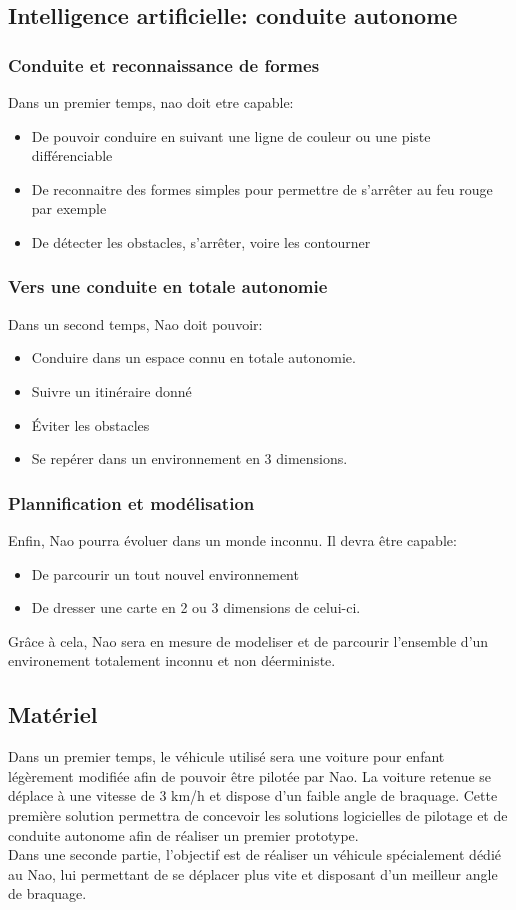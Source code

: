\documentclass[11pt]{report} %
\begin{document}
		\subsection{Intelligence artificielle: conduite autonome}
			\subsubsection{Conduite et reconnaissance de formes}
				Dans un premier temps, nao doit etre capable:
				\begin{itemize}
				\item De pouvoir conduire en suivant une ligne de couleur ou une piste différenciable
				\item De reconnaitre des formes simples pour permettre de s'arrêter au feu rouge par exemple
				\item De détecter les obstacles, s'arrêter, voire les contourner
				\end{itemize}
			\subsubsection{Vers une conduite en totale autonomie}
				Dans un second temps, Nao doit pouvoir:
				\begin{itemize}
			  	\item Conduire dans un espace connu en totale autonomie.
				\item Suivre un itinéraire donné
				\item Éviter les obstacles
				\item Se repérer dans un environnement en 3 dimensions.
				\end{itemize}
			\subsubsection{Plannification et modélisation}
				Enfin, Nao pourra évoluer dans un monde inconnu. Il devra être capable:
				\begin{itemize}
				\item De parcourir un tout nouvel environnement
				\item De dresser une carte en 2 ou 3 dimensions de celui-ci.
				\end{itemize}
				Grâce à cela, Nao sera en mesure de modeliser et de parcourir l'ensemble d'un environement totalement inconnu et non déerministe.
		\subsection{Matériel}
			Dans un premier temps, le véhicule utilisé sera une voiture pour enfant légèrement modifiée afin de pouvoir être pilotée par Nao. La voiture retenue se déplace à une vitesse de 3 km/h et dispose d'un faible angle de braquage. Cette première solution permettra de concevoir les solutions logicielles de pilotage et de conduite autonome afin de réaliser un premier prototype.\\
			Dans une seconde partie, l'objectif est de réaliser un véhicule spécialement dédié au Nao, lui permettant de se déplacer plus vite et disposant d'un meilleur angle de braquage.
\end{document}
